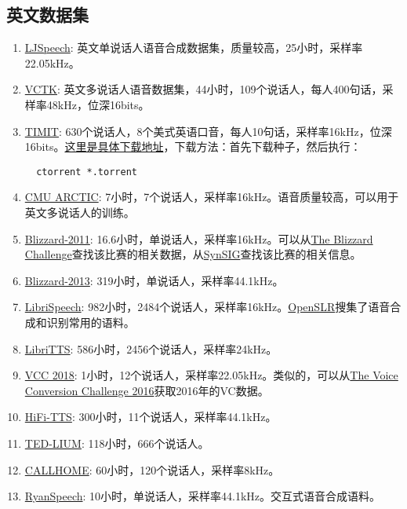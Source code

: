 \documentclass[cn,10pt,math=newtx,citestyle=gb7714-2015,bibstyle=gb7714-2015]{elegantbook}
\begin{document}
\subsection{英文数据集}
\begin{enumerate}
  \item \href{https://keithito.com/LJ-Speech-Dataset/}{LJSpeech}: 英文单说话人语音合成数据集，质量较高，25小时，采样率22.05kHz。
  \item \href{https://datashare.is.ed.ac.uk/handle/10283/2651}{VCTK}: 英文多说话人语音数据集，44小时，109个说话人，每人400句话，采样率48kHz，位深16bits。
  \item \href{https://catalog.ldc.upenn.edu/LDC93S1}{TIMIT}: 630个说话人，8个美式英语口音，每人10句话，采样率16kHz，位深16bits。\href{http://academictorrents.com/details/34e2b78745138186976cbc27939b1b34d18bd5b3}{这里是具体下载地址}，下载方法：首先下载种子，然后执行：
  \begin{lstlisting}
  ctorrent *.torrent
  \end{lstlisting}
  \item \href{http://festvox.org/cmu_arctic/packed/}{CMU ARCTIC}: 7小时，7个说话人，采样率16kHz。语音质量较高，可以用于英文多说话人的训练。
  \item \href{https://www.cstr.ed.ac.uk/projects/blizzard/2011/lessac_blizzard2011/}{Blizzard-2011}: 16.6小时，单说话人，采样率16kHz。可以从\href{https://www.cstr.ed.ac.uk/projects/blizzard/}{The Blizzard Challenge}查找该比赛的相关数据，从\href{https://www.synsig.org/index.php}{SynSIG}查找该比赛的相关信息。
  \item \href{https://www.cstr.ed.ac.uk/projects/blizzard/2013/lessac_blizzard2013/}{Blizzard-2013}: 319小时，单说话人，采样率44.1kHz。
  \item \href{https://www.openslr.org/12}{LibriSpeech}: 982小时，2484个说话人，采样率16kHz。\href{https://www.openslr.org/resources.php}{OpenSLR}搜集了语音合成和识别常用的语料。
  \item \href{https://www.openslr.org/60}{LibriTTS}: 586小时，2456个说话人，采样率24kHz。
  \item \href{https://datashare.ed.ac.uk/handle/10283/3061}{VCC 2018}: 1小时，12个说话人，采样率22.05kHz。类似的，可以从\href{https://datashare.ed.ac.uk/handle/10283/2211}{The Voice Conversion Challenge 2016}获取2016年的VC数据。
  \item \href{http://www.openslr.org/109/}{HiFi-TTS}: 300小时，11个说话人，采样率44.1kHz。
  \item \href{https://www.openslr.org/7/}{TED-LIUM}: 118小时，666个说话人。
  \item \href{https://catalog.ldc.upenn.edu/LDC97S42}{CALLHOME}: 60小时，120个说话人，采样率8kHz。
  \item \href{https://github.com/roholazandie/ryan-tts}{RyanSpeech}: 10小时，单说话人，采样率44.1kHz。交互式语音合成语料。

\end{enumerate}
\end{document}
